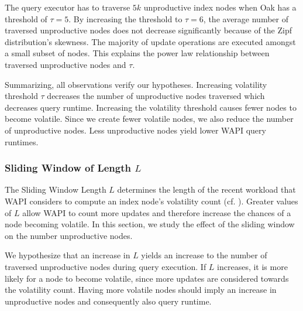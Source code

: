 \documentclass[abstracton,12pt]{scrartcl}
\theoremstyle{definition}
\begin{document}
The query executor has to traverse $5k$ unproductive index nodes when Oak has a
threshold of $\tau = 5$. By increasing the threshold to $\tau = 6$, the average
number of traversed unproductive nodes does not decrease significantly because
of the Zipf distribution's skewness. The majority of update operations are executed
amongst a small subset of nodes. This explains the power law relationship
between traversed unproductive nodes and $\tau$.

Summarizing, all observations verify our hypotheses.
Increasing volatility threshold $\tau$ decreases the number of unproductive
nodes traversed which decreases query runtime. Increasing the volatility
threshold causes fewer nodes to become volatile. Since we create fewer volatile
nodes, we also reduce the number of unproductive nodes. Less unproductive
nodes yield lower WAPI query runtimes. 

\subsubsection{Sliding Window of Length $L$}

\label{sec:sliding-window}

The Sliding Window Length $L$ determines the length of the recent workload that WAPI
considers to compute an index node's volatility count (cf. ).
Greater values of $L$
allow WAPI to count more updates and therefore increase the chances of a node
becoming volatile. In this section, we study
the effect of the sliding window on the number unproductive nodes.

We hypothesize that an increase in $L$ yields an increase to the number of
traversed unproductive nodes during query execution. If $L$ increases, it is
more likely for a node to become volatile, since more updates are considered
towards the volatility count.
Having more volatile nodes should imply an increase in unproductive nodes and
consequently also query runtime.

\end{document}

